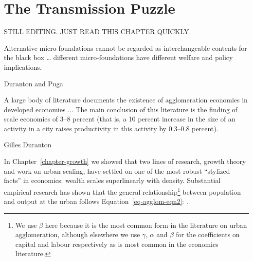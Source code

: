 \chapter{The Transmission Puzzle} \label{chapter-tramsmission}%

STILL EDITING. JUST READ THIS CHAPTER QUICKLY.

\epigraph{Alternative micro-foundations cannot be regarded as interchangeable contents for the black box \dots %
different micro-foundations have different welfare and policy implications. %
}{Duranton and Puga \cite{durantonMicroFoundationsUrbanAgglomeration2004}}

\epigraph{A large body of literature documents the existence of agglomeration economies in developed economies ... The main conclusion of this literature is the finding of scale economies of 3--8 percent (that is, a 10 percent increase in the size of an activity in a city raises productivity in this activity by 0.3--0.8 percent).}{Gilles Duranton \cite{durantonAreCitiesEngines2009}} %




In Chapter~\ref{chapter-growth} we showed that two lines of research, growth theory and work on urban scaling, have settled on one of the most robust ``stylized facts'' in economics: wealth scales superlinearly with density. Substantial empirical research has shown that the general relationship\footnote{We use $\beta$ here because it is the most common form in the literature on urban agglomeration, although elsewhere we use $\gamma$, $\alpha$ and $\beta$ for the coefficients on capital and labour respectively as is most common in the economics literature.} between population and output at the urban %
follows Equation~\ref{eq-agglom-eqn2}: \cite{loboUrbanScalingProduction2013}.

